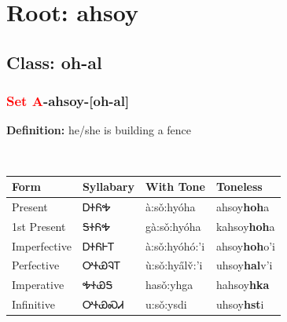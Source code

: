 \needspace{4in}
\section*{Root: ahsoy}
\nopagebreak
{}
\needspace{3in}
\subsection*{Class: oh-al}
\nopagebreak
\needspace{2in}
\subsubsection*{\textcolor{Red}{Set A}{-}\textbf{ahsoy}{-}[oh-al]}
\nopagebreak
\textbf{Definition: } he/she is building a fence
\\[0.5em]
\begin{tabularx}{\textwidth}{l X X X}%
\toprule%
\textbf{Form}&\textbf{Syllabary}&\textbf{With Tone}&\textbf{Toneless}\\%
\midrule%
Present&ᎠᏐᏲᎭ&à:sǒ:hyóha&ahsoy\textbf{hoh}a\\%
1st Present&ᎦᏐᏲᎭ&gà:sǒ:hyóha&kahsoy\textbf{hoh}a\\%
Imperfective&ᎠᏐᏲᎰᎢ&à:sǒ:hyóhó:’i&ahsoy\textbf{hoh}o'i\\%
Perfective&ᎤᏐᏯᎸᎢ&ù:sǒ:hya̋lv̌:’i&uhsoy\textbf{hal}v'i\\%
Imperative&ᎭᏐᏯᎦ&hasǒ:yhga&hahsoy\textbf{hka}\\%
Infinitive&ᎤᏐᏯᏍᏗ&u:sǒ:ysdi&uhsoy\textbf{hst}i\\%
\bottomrule%
\end{tabularx}
\\[1em]